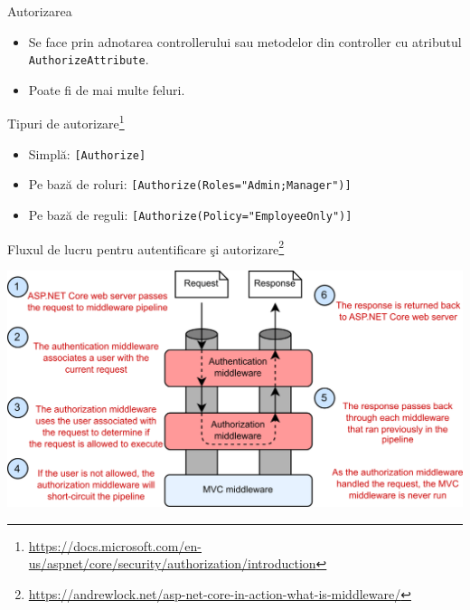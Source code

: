 \documentclass[presentation]{beamer}
\begin{document}
\begin{frame}[label={sec:org6e64615},fragile]{Autorizarea}
 \begin{itemize}
\item Se face prin adnotarea controllerului sau metodelor din controller cu atributul \texttt{AuthorizeAttribute}.
\item Poate fi de mai multe feluri.
\end{itemize}
\end{frame}
\begin{frame}[label={sec:org38c91ed},fragile]{Tipuri de autorizare\footnote{\url{https://docs.microsoft.com/en-us/aspnet/core/security/authorization/introduction}}}
 \begin{itemize}
\item Simplă: \texttt{[Authorize]}
\item Pe bază de roluri: \texttt{[Authorize(Roles="Admin;Manager")]}
\item Pe bază de reguli: \texttt{[Authorize(Policy="EmployeeOnly")]}
\end{itemize}
\end{frame}
\begin{frame}[label={sec:org2314a3e}]{Fluxul de lucru pentru autentificare şi autorizare\footnote{\url{https://andrewlock.net/asp-net-core-in-action-what-is-middleware/}}}
\begin{center}
\includegraphics[width=\textwidth]{img/auth.png}
\end{center}
\end{frame}
\end{document}
